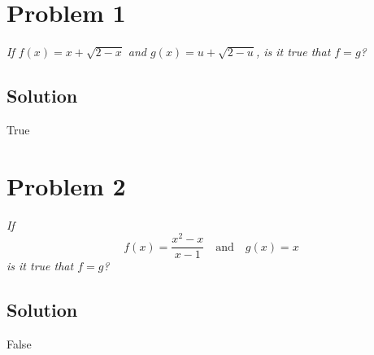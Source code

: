 \documentclass[11pt]{article}
\begin{document}
	
\section*{Problem 1}

\textit{If $f(x)=x+\sqrt{2-x}$ and $g(x)=u+\sqrt{2-u}$, is it true that $f=g$?}

\subsection*{Solution}

True


\section*{Problem 2}

\textit{If $$f(x)=\frac{x^2-x}{x-1} \quad\mathrm{and}\quad g(x)=x$$ is it true that $f=g$?}

\subsection*{Solution}

False
	
\end{document}
